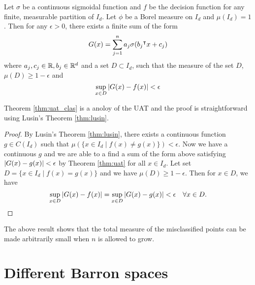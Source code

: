 \begin{theorem}
    \label{thm:uat_clas}
    Let $\sigma$ be a continuous sigmoidal function and $f$ be the decision
    function for any finite, measurable partition of $I_d$. Let $\phi$ be a
    Borel measure on $I_d$ and $\mu(I_d) = 1$. Then for any $\epsilon>0$, there
    exists a finite sum of the form
    \begin{equation}
        G(x) = \sum_{j=1}^n a_j \sigma(b_j{}^{\intercal} x + c_j)
    \end{equation}
    where $a_j, c_j \in \mathbb{R}, b_j \in \mathbb{R}^d$ and a set $D\subset I_d$, such that
    the measure of the set $D$, $\mu(D) \geq 1 - \epsilon$ and
    \begin{equation}
        \sup_{x\in D}\left| G(x) - f(x) \right| < \epsilon
    \end{equation}
\end{theorem}

Theorem \ref{thm:uat_clas} is a anoloy of the UAT and the proof is
straightforward using Lusin's Theorem \eqref{thm:lusin}.

\begin{proof}
    By Lusin's Theorem \eqref{thm:lusin}, there exists a continuous function $g
    \in C(I_d)$ such that $\mu(\{x\in I_d \mid f(x) \not= g(x)\}) < \epsilon$.
    Now we have a continuous $g$ and we are able to a find a sum of the form
    above satisfying $\left| G(x) - g(x) \right| < \epsilon$ by Theorem \eqref{thm:uat}
    for all $x\in I_d$. Let set $D = \{x\in I_d \mid f(x) = g(x)\}$ and we have
    $\mu(D) \geq 1 - \epsilon$. Then for $x\in D$, we have
    \begin{equation}
        \sup_{x\in D}\left| G(x)-f(x) \right| = \sup_{x\in D}\left| G(x) - g(x) \right| < \epsilon 
        \quad \forall x\in D.
    \end{equation}
\end{proof}

The above result shows that the total measure of the misclassified points can be
made arbitrarily small when $n$ is allowed to grow.

\section{Different Barron spaces}
\label{sec:different_barron_spaces}

